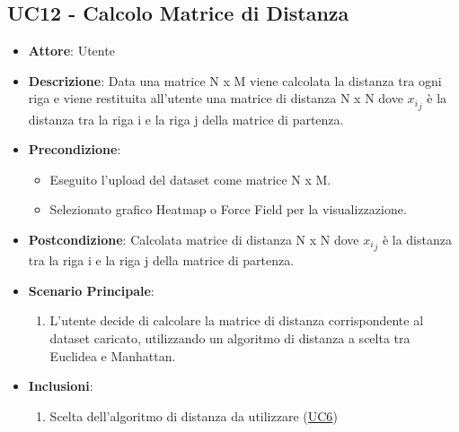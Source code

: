     \subsection{UC12 - Calcolo Matrice di Distanza}
    \begin{itemize}
    \item \textbf{Attore}: Utente
    \item \textbf{Descrizione}: Data una matrice N x M viene calcolata la distanza tra ogni riga e viene restituita all'utente una matrice di distanza N x N dove \({x_i}_j\) è la distanza tra la riga i e la riga j della matrice di partenza.
    \item \textbf{Precondizione}: 
    \begin{itemize}
        \item Eseguito l'upload del dataset come matrice N x M.
        \item Selezionato grafico Heatmap o Force Field per la visualizzazione.
    \end{itemize}  
    \item \textbf{Postcondizione}: Calcolata matrice di distanza N x N dove \({x_i}_j\) è la distanza tra la riga i e la riga j della matrice di partenza.
    \item \textbf{Scenario Principale}: 
    \begin{enumerate}
        \item L'utente decide di calcolare la matrice di distanza corrispondente al dataset caricato, utilizzando un algoritmo di distanza a scelta tra Euclidea e Manhattan.
    \end{enumerate}  
    \item \textbf{Inclusioni}:
        \begin{enumerate}
                \begin{enumerate}
                    \item Scelta dell'algoritmo di distanza da utilizzare (\hyperref[uc6]{UC6})
                \end{enumerate}
        \end{enumerate} 
    \end{itemize}
    
  
    
    
    
    
    
    
    
    